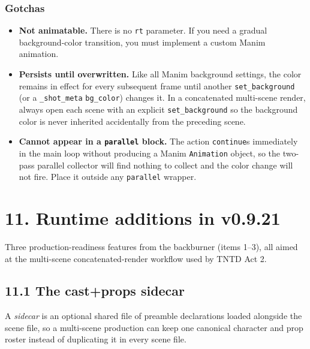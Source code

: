 \documentclass[
  11pt,
]{book}
\providecommand{\tightlist}{%
  \setlength{\itemsep}{0pt}\setlength{\parskip}{0pt}}
\begin{document}
\subsubsection{Gotchas}\label{set-background-gotchas}

\begin{itemize}
\tightlist
\item
  \textbf{Not animatable.} There is no \texttt{rt} parameter. If you
  need a gradual background-color transition, you must implement a
  custom Manim animation.
\item
  \textbf{Persists until overwritten.} Like all Manim background
  settings, the color remains in effect for every subsequent frame
  until another \texttt{set\_background} (or a \texttt{\_shot\_meta}
  \texttt{bg\_color}) changes it. In a concatenated multi-scene render,
  always open each scene with an explicit \texttt{set\_background} so
  the background color is never inherited accidentally from the
  preceding scene.
\item
  \textbf{Cannot appear in a \texttt{parallel} block.} The action
  \texttt{continue}s immediately in the main loop without producing a
  Manim \texttt{Animation} object, so the two-pass parallel collector
  will find nothing to collect and the color change will not fire.
  Place it outside any \texttt{parallel} wrapper.
\end{itemize}

\section{11. Runtime additions in
v0.9.21}\label{runtime-additions-in-v0.9.21}

Three production-readiness features from the backburner (items 1--3),
all aimed at the multi-scene concatenated-render workflow used by
TNTD Act 2.

\subsection{\texorpdfstring{11.1 The cast+props
sidecar}{11.1 The cast+props sidecar}}\label{the-cast-props-sidecar}

A \emph{sidecar} is an optional shared file of preamble declarations
loaded alongside the scene file, so a multi-scene production can keep
one canonical character and prop roster instead of duplicating it in
every scene file.
\end{document}
